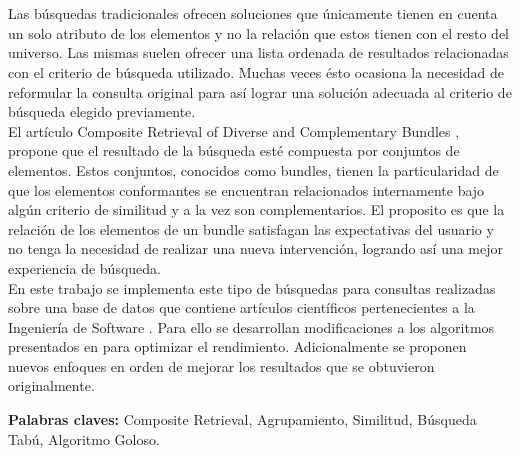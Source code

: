 \chapter*{\runtitulo}

\noindent Las búsquedas tradicionales ofrecen soluciones que únicamente tienen en cuenta un solo atributo de los elementos y no la relación que estos tienen con el resto del universo. Las mismas suelen ofrecer una lista ordenada de resultados relacionadas con el criterio de búsqueda utilizado. Muchas veces ésto ocasiona la necesidad de reformular la consulta original para así lograr una solución adecuada al criterio de búsqueda elegido previamente.\\
El artículo Composite Retrieval of Diverse and Complementary Bundles \cite{compositeRetrival}, propone que el resultado de la búsqueda esté compuesta por conjuntos de elementos. Estos conjuntos, conocidos como bundles, tienen la particularidad de que los elementos conformantes se encuentran relacionados internamente bajo algún criterio de similitud y a la vez son complementarios. El proposito es que la relación de los elementos de un bundle satisfagan las expectativas del usuario y no tenga la necesidad de realizar una nueva intervención, logrando así una mejor experiencia de búsqueda.\\
En este trabajo se implementa este tipo de búsquedas para consultas realizadas sobre una base de datos que contiene artículos científicos pertenecientes a la Ingeniería de Software \cite{dataDrive}. Para ello se desarrollan modificaciones a los algoritmos presentados en \cite{compositeRetrival} para optimizar el rendimiento. Adicionalmente se proponen nuevos enfoques en orden de mejorar los resultados que se obtuvieron originalmente.

\bigskip

\noindent\textbf{Palabras claves:} Composite Retrieval, Agrupamiento, Similitud, Búsqueda Tabú, Algoritmo Goloso.